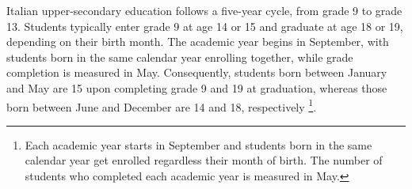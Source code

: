 \documentclass[12pt]{article}
\theoremstyle{plain}
\theoremstyle{plain}
\theoremstyle{plain}
\theoremstyle{definition}
\theoremstyle{plain}
\theoremstyle{definition}
\theoremstyle{plain}
\theoremstyle{remark}
\theoremstyle{definition}
\theoremstyle{definition}
\theoremstyle{plain}
\begin{document}
\begin{table}[H]
\caption{Types of high school tracks in the Italian educational system.}
\label{tab:jmp_hs_tracks}
\vspace{0.2cm}
\centering
{}
\end{table}
\vspace{0.5cm}


Italian upper-secondary education follows a five-year cycle, from grade 9 to grade 13. Students typically enter grade 9 at age 14 or 15 and graduate at age 18 or 19, depending on their birth month. The academic year begins in September, with students born in the same calendar year enrolling together, while grade completion is measured in May. Consequently, students born between January and May are 15 upon completing grade 9 and 19 at graduation, whereas those born between June and December are 14 and 18, respectively \footnote{Each academic year starts in September and students born in the same calendar year get enrolled regardless their month of birth. The number of students who completed each academic year is measured in May.}.
\vspace{0.3cm}
\end{document}
